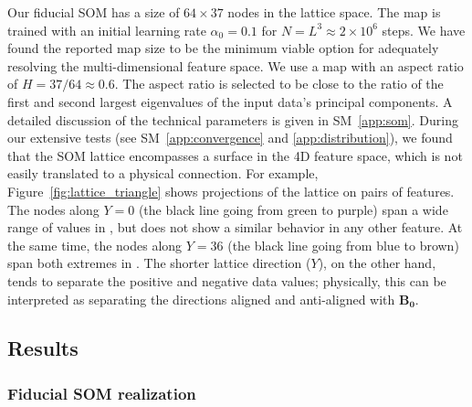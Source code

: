 Our fiducial SOM has a size of $64\times 37$ nodes in the lattice space.
The map is trained with an initial learning rate $\alpha_0 = 0.1$ for $N = L^3 \approx 2\times10^6$ steps.
We have found the reported map size to be the minimum viable option for adequately resolving the multi-dimensional feature space.
We use a map with an aspect ratio of $H = 37/64 \approx 0.6$.
The aspect ratio is selected to be close to the ratio of the first and second largest eigenvalues of the input data's principal components.
A detailed discussion of the technical parameters is given in SM~\ref{app:som}.
During our extensive tests (see SM~\ref{app:convergence} and \ref{app:distribution}), we found that the SOM lattice encompasses a surface in the 4D feature space, which is not easily translated to a physical connection.
For example, Figure~\ref{fig:lattice_triangle} shows projections of the lattice on pairs of features.
The nodes along $Y=0$ (the black line going from green to purple) span a wide range of values in \jasym, but does not show a similar behavior in any other feature.
At the same time, the nodes along $Y=36$ (the black line going from blue to brown) span both extremes in \epar.
The shorter lattice direction ($Y$), on the other hand, tends to separate the positive and negative data values;
physically, this can be interpreted as separating the directions aligned and anti-aligned with $\mathbf{B_0}$.

\subsection{Results} \label{sec:result}

\subsubsection{Fiducial SOM realization}

